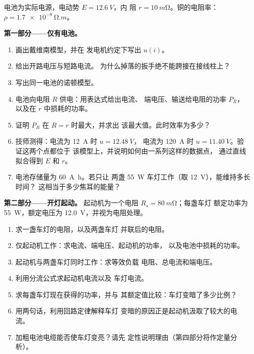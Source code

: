 \begin{problem}
\label{pb:b1:dc-circuits:1}
电池为实际电源，电动势 $E = \qty{12.6}{V}$，内
阻 $r = \qty{10}{m\ohm}$。铜的电阻率：$\rho = \qty{1.7e-8}{\ohm.m}$。

\medskip
\noindent\textbf{第一部分——仅有电池。}
\begin{enumerate}
  \item 画出戴维南模型，并在
        发电机约定下写出 $u(i)$。
  \item 给出开路电压与短路电流。
        为什么掉落的扳手绝不能跨接在接线柱上？
  \item 写出同一电池的诺顿模型。
  \item 电池向电阻 $R$ 供电：用表达式给出电流、
        端电压、输送给电阻的功率 $P_R$，以及在
        $r$ 中损耗的功率。
  \item 证明 $P_R$ 在 $R = r$ 时最大，并求出
        该最大值。此时效率为多少？
  \item 技师测得：电流为 \qty{12}{A} 时 $u = \qty{12.48}{V}$，
        电流为 \qty{120}{A} 时 $u = \qty{11.40}{V}$。验证这两个点都位于
        该模型上，并说明如何由一系列这样的数据点，
        通过直线拟合得到 $E$ 和 $r$。
  \item 电池存储量为 \qty{60}{A.h}。若只让
        两盏 \qty{55}{W} 车灯工作（取 \qty{12}{V}），能维持多长时间？
        这相当于多少焦耳的能量？
\end{enumerate}

\medskip
\noindent\textbf{第二部分——开灯起动。}
起动机为一个电阻 $R_s = \qty{80}{m\ohm}$；每盏车灯
额定功率为 \qty{55}{W}，额定电压为 \qty{12.0}{V}，并视为电阻处理。
\begin{enumerate}[resume]
  \item 求一盏车灯的电阻，以及两盏车灯
        并联后的电阻。
  \item 仅起动机工作：求电流、端电压、起动机的功率，
        以及电池中损耗的功率。
  \item 起动机与两盏车灯同时工作：求等效负载
        电阻、总电流和端电压。
  \item 利用分流公式求起动机电流以及
        车灯电流。
  \item 求每盏车灯现在获得的功率，并与
        其额定值比较：车灯变暗了多少比例？
  \item 用两句话，利用回路定律解释车灯
        变暗的原因正是起动机汲取了较大的电流。
  \item 加粗电池电缆能否使车灯变亮？请先
        定性说明理由（第四部分将作定量分析）。
\end{enumerate}


\end{problem}
